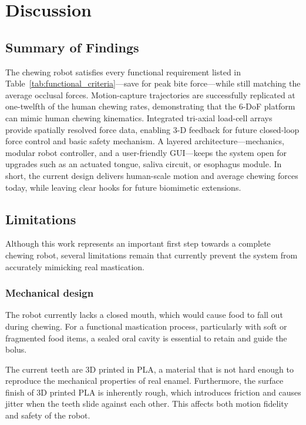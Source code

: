\section{Discussion}

\subsection{Summary of Findings}

The chewing robot satisfies every functional requirement listed in Table~\ref{tab:functional_criteria}—save for peak bite force—while still matching the average occlusal forces. 
Motion-capture trajectories are successfully replicated at one-twelfth of the human chewing rates, demonstrating that the 6-DoF platform can mimic human chewing kinematics. 
Integrated tri-axial load-cell arrays provide spatially resolved force data, enabling 3-D feedback for future closed-loop force control and basic safety mechanism. 
A layered architecture—mechanics, modular robot controller, and a user-friendly GUI—keeps the system open for upgrades such as an actuated tongue, saliva circuit, or esophagus module. 
In short, the current design delivers human-scale motion and average chewing forces today, while leaving clear hooks for future biomimetic extensions.

\subsection{Limitations}

Although this work represents an important first step towards a complete chewing robot, several limitations remain that currently prevent the system from 
accurately mimicking real mastication.

\subsubsection{Mechanical design}
The robot currently lacks a closed mouth, which would cause food to fall out during chewing. For a functional mastication process, 
particularly with soft or fragmented food items, a sealed oral cavity is essential to retain and guide the bolus.

The current teeth are 3D printed in PLA, a material that is not hard enough to reproduce the mechanical properties of real enamel. Furthermore, the surface finish of 3D printed PLA is inherently rough, which introduces friction and causes 
jitter when the teeth slide against each other. This affects both motion fidelity and safety of the robot.


